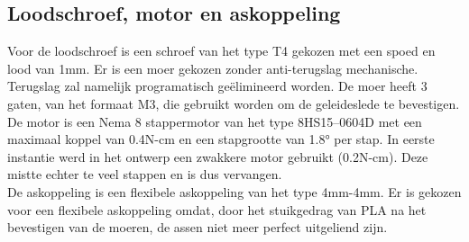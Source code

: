 \subsection{Loodschroef, motor en askoppeling}
Voor de loodschroef is een schroef van het type T4 gekozen met een spoed en lood van 1mm. Er is een moer gekozen zonder anti-terugslag mechanische. Terugslag zal namelijk programatisch geëlimineerd worden. De moer heeft 3 gaten, van het formaat M3, die gebruikt worden om de geleideslede te bevestigen.
\\[12pt]De motor is een Nema 8 stappermotor van het type 8HS15--0604D met een maximaal koppel van 0.4N-cm en een stapgrootte van 1.8° per stap. In eerste instantie werd in het ontwerp een zwakkere motor gebruikt (0.2N-cm). Deze mistte echter te veel stappen en is dus vervangen.
\\[12pt]De askoppeling is een flexibele askoppeling van het type 4mm-4mm. Er is gekozen voor een flexibele askoppeling omdat, door het stuikgedrag van PLA na het bevestigen van de moeren, de assen niet meer perfect uitgeliend zijn.


